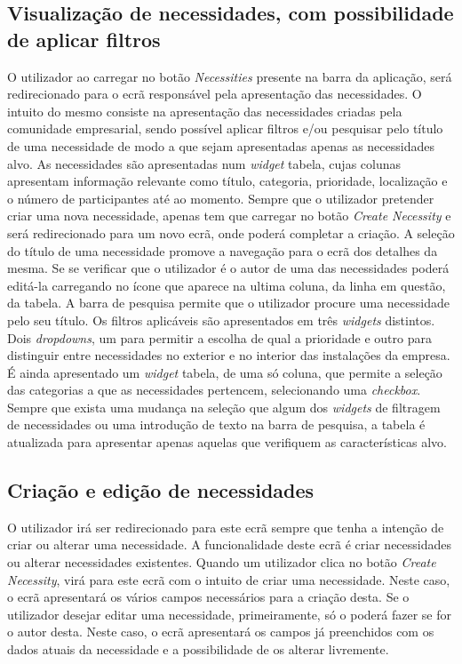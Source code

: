 \subsection{Visualização de necessidades, com possibilidade de aplicar filtros} \label{secNecessities}

O utilizador ao carregar no botão \textit{Necessities} presente na barra da aplicação, será redirecionado para o ecrã responsável pela apresentação das necessidades. 
O intuito do mesmo consiste na apresentação das necessidades criadas pela comunidade empresarial, sendo possível aplicar filtros e/ou pesquisar pelo título de uma necessidade de modo a que sejam apresentadas apenas as necessidades alvo.
As necessidades são apresentadas num \textit{widget} tabela, cujas colunas apresentam informação relevante como título, categoria, prioridade, localização e o número de participantes até ao momento. Sempre que o utilizador pretender criar uma nova necessidade, apenas tem que carregar no botão \textit{Create Necessity} e será redirecionado para um novo ecrã, onde poderá completar a criação.
A seleção do título de uma necessidade promove a navegação para o ecrã dos detalhes da mesma. Se se verificar que o utilizador é o autor de uma das necessidades poderá editá-la carregando no ícone que aparece na ultima coluna, da linha em questão, da tabela.
A barra de pesquisa permite que o utilizador procure uma necessidade pelo seu título.
Os filtros aplicáveis são apresentados em três \textit{widgets} distintos. Dois \textit{dropdowns}, um para permitir a escolha de qual a prioridade e outro para distinguir entre necessidades no exterior e no interior das instalações da empresa.
É ainda apresentado um \textit{widget} tabela, de uma só coluna, que permite a seleção das categorias a que as necessidades pertencem, selecionando uma \textit{checkbox}.  
Sempre que exista uma mudança na seleção que algum dos \textit{widgets} de filtragem de necessidades ou uma introdução de texto na barra de pesquisa, a tabela é atualizada para apresentar apenas aquelas que verifiquem as características alvo. 


\subsection{Criação e edição de necessidades}\label{secNecessityCreation}

O utilizador irá ser redirecionado para este ecrã sempre que tenha a intenção de criar ou alterar uma necessidade.
A funcionalidade deste ecrã é criar necessidades ou alterar necessidades existentes.
Quando um utilizador clica no botão \textit{Create Necessity}, virá para este ecrã com o intuito de criar uma necessidade.
Neste caso, o ecrã apresentará os vários campos necessários para a criação desta.
Se o utilizador desejar editar uma necessidade, primeiramente, só o poderá fazer se for o autor desta.
Neste caso, o ecrã apresentará os campos já preenchidos com os dados atuais da necessidade e a possibilidade de os alterar livremente.

